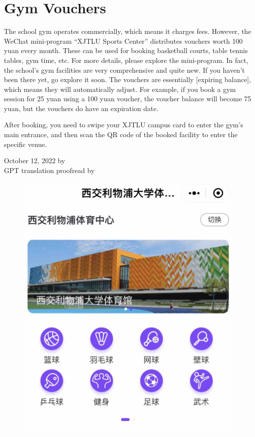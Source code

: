 \section{Gym Vouchers}
\begin{minipage}[t]{0.5\textwidth}
    The school gym operates commercially, which means it charges fees. However, the WeChat mini-program “XJTLU Sports Center” distributes vouchers worth 100 yuan every month. These can be used for booking basketball courts, table tennis tables, gym time, etc. For more details, please explore the mini-program. In fact, the school’s gym facilities are very comprehensive and quite new. If you haven’t been there yet, go explore it soon. The vouchers are essentially [expiring balance], which means they will automatically adjust. For example, if you book a gym session for 25 yuan using a 100 yuan voucher, the voucher balance will become 75 yuan, but the vouchers do have an expiration date.

    After booking, you need to swipe your XJTLU campus card to enter the gym’s main entrance, and then scan the QR code of the booked facility to enter the specific venue.

    \begin{flushright}
        October 12, 2022 by \Wu \\
        GPT translation proofread by \Shiyao
    \end{flushright}
\end{minipage}
\begin{minipage}[t]{0.45\textwidth}
    \begin{figure}[H]
        \includegraphics[width=0.95\columnwidth, right]{author-folder/Kai.Wu/sportcenter_miniprogram.jpg}
    \end{figure}
\end{minipage}

